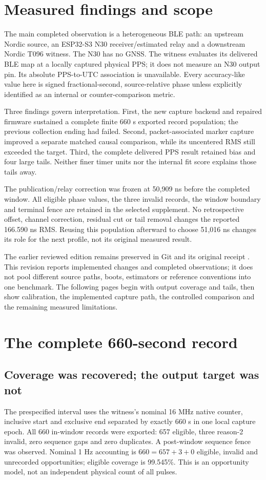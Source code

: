 \documentclass[10pt,letterpaper]{article}
\begin{document}
\section{Measured findings and scope}\label{sec:findings}
The main completed observation is a heterogeneous BLE path: an upstream Nordic source, an ESP32-S3 N30 receiver/estimated relay and a downstream Nordic T096 witness. The N30 has no GNSS. The witness evaluates its delivered BLE map at a locally captured physical PPS; it does not measure an N30 output pin. Its absolute PPS-to-UTC association is unavailable. Every accuracy-like value here is signed fractional-second, source-relative phase unless explicitly identified as an internal or counter-comparison metric.

Three findings govern interpretation. First, the new capture backend and repaired firmware sustained a complete finite 660 s exported record population; the previous collection ending had failed. Second, packet-associated marker capture improved a separate matched causal comparison, while its uncentered RMS still exceeded the target. Third, the complete delivered PPS result retained bias and four large tails. Neither finer timer units nor the internal fit score explains those tails away.

The publication/relay correction was frozen at 50,909 ns before the completed window. All eligible phase values, the three invalid records, the window boundary and terminal fence are retained in the selected supplement. No retrospective offset, channel correction, residual cut or tail removal changes the reported 166.590 ns RMS. Reusing this population afterward to choose 51,016 ns changes its role for the next profile, not its original measured result.

The earlier reviewed edition remains preserved in Git and its original receipt \cite{previous}. This revision reports implemented changes and completed observations; it does not pool different source paths, boots, estimators or reference conventions into one benchmark. The following pages begin with output coverage and tails, then show calibration, the implemented capture path, the controlled comparison and the remaining measured limitations.
\newpage

\section{The complete 660-second record}\label{sec:full}
\subsection{Coverage was recovered; the output target was not}
The prespecified interval uses the witness's nominal 16 MHz native counter, inclusive start and exclusive end separated by exactly 660 s in one local capture epoch. All 660 in-window records were exported: 657 eligible, three reason-2 invalid, zero sequence gaps and zero duplicates. A post-window sequence fence was observed. Nominal 1 Hz accounting is $660=657+3+0$ eligible, invalid and unrecorded opportunities; eligible coverage is 99.545\%. This is an opportunity model, not an independent physical count of all pulses.
\end{document}

